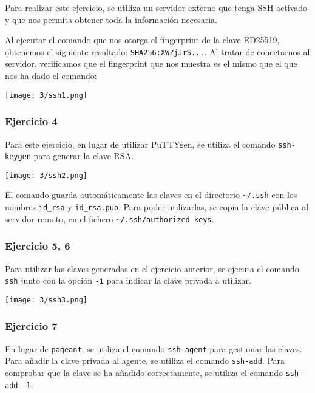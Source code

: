 Para realizar este ejercicio, se utiliza un servidor externo que tenga SSH activado
y que nos permita obtener toda la información necesaria.

Al ejecutar el comando que nos otorga el fingerprint de la clave ED25519, obtenemos
el siguiente resultado: \Verb#SHA256:XWZjJrS...#. Al tratar de conectarnos al
servidor, verificamos que el fingerprint que nos muestra es el mismo que el que
nos ha dado el comando:
\begin{minipage}{\linewidth}
    \centering
    \texttt{[image: 3/ssh1.png]}
    \label{fig:3/6}
\end{minipage}

\subsubsection{Ejercicio 4}
Para este ejercicio, en lugar de utilizar PuTTYgen, se utiliza el comando \Verb#ssh-keygen#
para generar la clave RSA{.}

\begin{minipage}{\linewidth}
    \centering
    \texttt{[image: 3/ssh2.png]}
    \label{fig:3/7}
\end{minipage}

El comando guarda automáticamente las claves en el directorio \Verb#~/.ssh# con los
nombres \Verb#id_rsa# y \Verb#id_rsa.pub#. Para poder utilizarlas, se copia la clave
pública al servidor remoto, en el fichero \Verb#~/.ssh/authorized_keys#.

\subsubsection{Ejercicio 5, 6}
Para utilizar las claves generadas en el ejercicio anterior, se ejecuta el comando
\Verb#ssh# junto con la opción \Verb#-i# para indicar la clave privada a utilizar.

\begin{minipage}{\linewidth}
    \centering
    \texttt{[image: 3/ssh3.png]}
    \label{fig:3/8}
\end{minipage}

\subsubsection{Ejercicio 7}
En lugar de \Verb#pageant#, se utiliza el comando \Verb#ssh-agent# para gestionar
las claves. Para añadir la clave privada al agente, se utiliza el comando
\Verb#ssh-add#. Para comprobar que la clave se ha añadido correctamente, se utiliza
el comando \Verb#ssh-add -l#.

